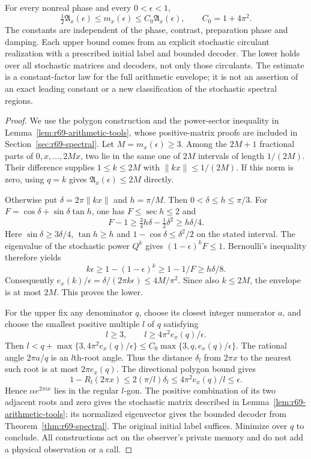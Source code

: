 \begin{theorem}\label{thm:r71-envelope}
For every nonreal phase and every $0<\epsilon<1$,
\begin{equation}\label{eq:r71-envelope}
 \tfrac12\mathfrak A_x(\epsilon)
 \le m_x(\epsilon)
 \le C_0\mathfrak A_x(\epsilon),\qquad C_0=1+4\pi^2.
\end{equation}
The constants are independent of the phase, contrast, preparation phase and damping. Each upper bound comes from an explicit stochastic circulant realization with a prescribed initial label and bounded decoder. The lower holds over all stochastic matrices and decoders, not only those circulants. The estimate is a constant-factor law for the full arithmetic envelope; it is not an assertion of an exact leading constant or a new classification of the stochastic spectral regions.
\end{theorem}
\begin{proof}
We use the polygon construction and the power-sector inequality in Lemma~\ref{lem:r69-arithmetic-tools}, whose positive-matrix proofs are included in Section~\ref{sec:r69-spectral}. Let $M=m_x(\epsilon)\ge3$. Among the $2M+1$ fractional parts of $0,x,\ldots,2Mx$, two lie in the same one of $2M$ intervals of length $1/(2M)$. Their difference supplies $1\le k\le2M$ with $\|kx\|\le1/(2M)$. If this norm is zero, using $q=k$ gives $\mathfrak A_x(\epsilon)\le2M$ directly.

Otherwise put $\delta=2\pi\|kx\|$ and $h=\pi/M$. Then $0<\delta\le h\le\pi/3$. For
$F=\cos\delta+\sin\delta\tan h$, one has $F\le\sec h\le2$ and
\[
 F-1\ge\tfrac34h\delta-\tfrac12\delta^2\ge h\delta/4.
\]
Here $\sin\delta\ge3\delta/4$, $\tan h\ge h$ and $1-\cos\delta\le\delta^2/2$ on the stated interval. The eigenvalue of the stochastic power $Q^k$ gives $(1-\epsilon)^kF\le1$. Bernoulli's inequality therefore yields
\[
 k\epsilon\ge1-(1-\epsilon)^k\ge1-1/F\ge h\delta/8.
\]
Consequently $e_x(k)/\epsilon=\delta/(2\pi k\epsilon)\le4M/\pi^2$. Since also $k\le2M$, the envelope is at most $2M$. This proves the lower.

For the upper fix any denominator $q$, choose its closest integer numerator $a$, and choose the smallest positive multiple $l$ of $q$ satisfying
\[
 l\ge3,\qquad l\ge4\pi^2e_x(q)/\epsilon.
\]
Then
$l<q+\max\{3,4\pi^2e_x(q)/\epsilon\}\le C_0\max\{3,q,e_x(q)/\epsilon\}$.
The rational angle $2\pi a/q$ is an $l$th-root angle. Thus the distance $\delta_l$ from $2\pi x$ to the nearest such root is at most $2\pi e_x(q)$. The directional polygon bound gives
\[
 1-R_l(2\pi x)\le2(\pi/l)\delta_l
             \le4\pi^2e_x(q)/l\le\epsilon.
\]
Hence $\alpha e^{2\pi ix}$ lies in the regular $l$-gon. The positive combination of its two adjacent roots and zero gives the stochastic matrix described in Lemma~\ref{lem:r69-arithmetic-tools}; its normalized eigenvector gives the bounded decoder from Theorem~\ref{thm:r69-spectral}. The original initial label suffices. Minimize over $q$ to conclude. All constructions act on the observer's private memory and do not add a physical observation or a call.
\end{proof}

